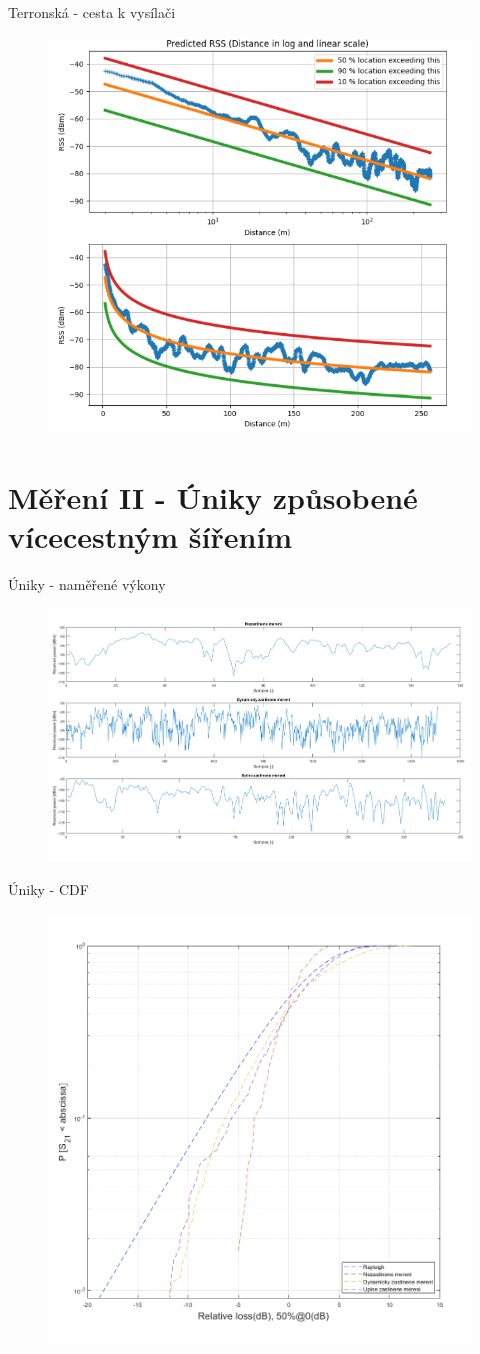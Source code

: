 \documentclass[aspectratio=169, 12pt, hyperref={unicode}]{beamer}
\begin{document}
\begin{frame}{Terronská - cesta k vysílači}
	\begin{figure}[!ht]
		\centering
		\includegraphics[width=.5\textwidth]{src/terronska-k-vysilaci-3.png}
	\end{figure}
\end{frame}

\section{Měření II - Úniky způsobené vícecestným šířením}
\begin{frame}{Úniky - naměřené výkony}
	\begin{figure}[!ht]
		\centering
		\includegraphics[width=.75\textwidth]{src/uniky-vykon.png}
	\end{figure}
\end{frame}
\begin{frame}{Úniky - CDF}
	\begin{figure}[!ht]
		\centering
		\includegraphics[width=.45\textwidth]{src/uniky-rayleigh.png}
	\end{figure}
\end{frame}
\end{document}

